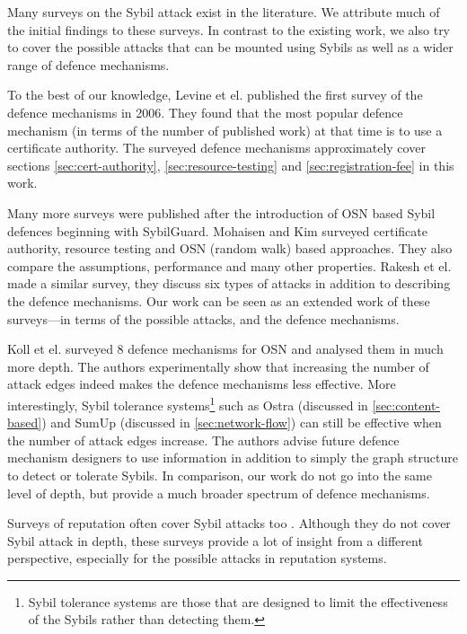 Many surveys on the Sybil attack exist in the literature. We attribute much of
the initial findings to these surveys. In contrast to the existing work,
we also try to cover the possible attacks that can be mounted using Sybils as
well as a wider range of defence mechanisms.

To the best of our knowledge, Levine et el. published the first survey of the
defence mechanisms\cite{marti2006taxonomy} in 2006. They found that the most
popular defence mechanism (in terms of the number of published work) at that
time is to use a certificate authority. The surveyed defence mechanisms
approximately cover sections \ref{sec:cert-authority},
\ref{sec:resource-testing} and \ref{sec:registration-fee} in this work.

Many more surveys were published after the introduction of OSN based Sybil
defences beginning with SybilGuard. Mohaisen and Kim surveyed certificate
authority, resource testing and OSN (random walk) based
approaches\cite{mohaisen2013sybil}. They also compare the assumptions,
performance and many other properties. Rakesh et el. made a similar
survey\cite{rakesh2014survey}, they discuss six types of attacks in addition to
describing the defence mechanisms. Our work can be seen as an extended work of
these surveys---in terms of the possible attacks, and the defence mechanisms.

Koll et el. surveyed 8 defence mechanisms for OSN and analysed them in much more
depth\cite{koll2014state}. The authors experimentally show that increasing the
number of attack edges indeed makes the defence mechanisms less effective. More
interestingly, Sybil tolerance systems\footnote{Sybil tolerance systems are
  those that are designed to limit the effectiveness of the Sybils rather than
  detecting them.} such as Ostra (discussed in \autoref{sec:content-based}) and
SumUp (discussed in \autoref{sec:network-flow}) can still be effective when the
number of attack edges increase. The authors advise future defence mechanism
designers to use information in addition to simply the graph structure to detect
or tolerate Sybils. In comparison, our work do not go into the same level of
depth, but provide a much broader spectrum of defence mechanisms.

Surveys of reputation often cover Sybil attacks too \cite{marti2006taxonomy,
  hoffman2009survey, koutrouli2012taxonomy, selvaraj2012survey}. Although they
do not cover Sybil attack in depth, these surveys provide a lot of insight from
a different perspective, especially for the possible attacks in reputation
systems.

